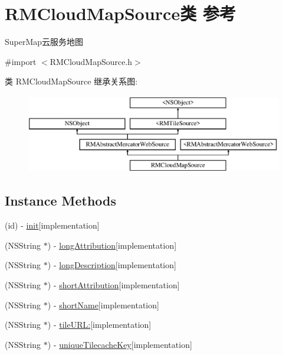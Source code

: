 \hypertarget{interface_r_m_cloud_map_source}{\section{R\-M\-Cloud\-Map\-Source类 参考}
\label{interface_r_m_cloud_map_source}
}


Super\-Map云服务地图  




{\ttfamily \#import $<$R\-M\-Cloud\-Map\-Source.\-h$>$}

类 R\-M\-Cloud\-Map\-Source 继承关系图\-:\begin{figure}[H]
\begin{center}
\leavevmode
\includegraphics[height=3.425076cm]{interface_r_m_cloud_map_source}
\end{center}
\end{figure}
\subsection*{Instance Methods}
\begin{DoxyCompactItemize}
\item 
(id) -\/ \hyperlink{interface_r_m_cloud_map_source_af878223b3719bd71f274050374cd7cda}{init}{\ttfamily  \mbox{[}implementation\mbox{]}}
\item 
(N\-S\-String $\ast$) -\/ \hyperlink{interface_r_m_cloud_map_source_afc502c38dc65ff4ca970e7da5b39c5e1}{long\-Attribution}{\ttfamily  \mbox{[}implementation\mbox{]}}
\item 
(N\-S\-String $\ast$) -\/ \hyperlink{interface_r_m_cloud_map_source_a4c0753b3fee1264ceca0dd2fd46af299}{long\-Description}{\ttfamily  \mbox{[}implementation\mbox{]}}
\item 
(N\-S\-String $\ast$) -\/ \hyperlink{interface_r_m_cloud_map_source_ada3be85455de2b8dae2032035d870f3e}{short\-Attribution}{\ttfamily  \mbox{[}implementation\mbox{]}}
\item 
(N\-S\-String $\ast$) -\/ \hyperlink{interface_r_m_cloud_map_source_ad968ed767e547a7f97753e0ec34dec63}{short\-Name}{\ttfamily  \mbox{[}implementation\mbox{]}}
\item 
(N\-S\-String $\ast$) -\/ \hyperlink{interface_r_m_cloud_map_source_a13edb9f13639697b38732636d71688c1}{tile\-U\-R\-L\-:}{\ttfamily  \mbox{[}implementation\mbox{]}}
\item 
(N\-S\-String $\ast$) -\/ \hyperlink{interface_r_m_cloud_map_source_a7c4d7bb98a9fee5864622a1c5e342dd8}{unique\-Tilecache\-Key}{\ttfamily  \mbox{[}implementation\mbox{]}}
\end{DoxyCompactItemize}
